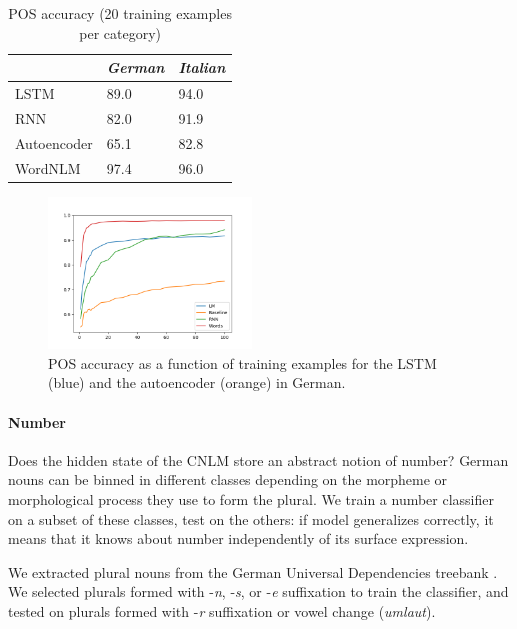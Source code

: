\begin{table}[t]
  \begin{center}
    \begin{tabular}{l|l|l}
      \multicolumn{1}{c}{}&\emph{German}&\emph{Italian}\\
      \hline
      LSTM & 89.0 & 94.0 \\
      RNN & 82.0 & 91.9 \\
      Autoencoder & 65.1 & 82.8 \\
      WordNLM & 97.4 & 96.0 \\
    \end{tabular}
  \end{center}
  \caption{\label{tab:pos-results} POS accuracy (20 training examples per category)}
\end{table}


\begin{figure}
\includegraphics[width=0.48\textwidth]{figures/german_pos_nouns_verbs.png}
	\caption{POS accuracy as a function of training examples for the LSTM (blue) and the autoencoder (orange) in German.}\label{fig:pos-induction}
\end{figure}





\paragraph{Number}
Does the hidden state of the CNLM store an abstract notion of
number?
German nouns can be binned in different classes depending on
the morpheme or morphological process they use to form the plural. We
train a number classifier on a subset of these classes, test on the
others: if model generalizes correctly, it means that it knows about
number independently of its surface expression.

We extracted plural nouns from the German Universal Dependencies treebank \cite{de2006generating,mcdonald2013universal}.
We selected plurals formed with -\emph{n}, -\emph{s}, or -\emph{e} suffixation to train the classifier, and tested on plurals formed with -\emph{r} suffixation or vowel change (\emph{umlaut}).

